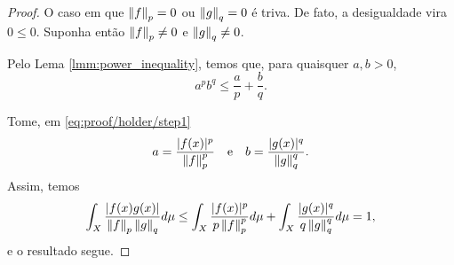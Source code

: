 \begin{proof}
    O caso em que $\left\lVert f \right\rVert_p = 0$ ou $\left\lVert g \right\rVert_q = 0$ é triva. De fato, a desigualdade vira $0 \leq 0$. Suponha então $\left\lVert f \right\rVert_p \neq 0$ e $\left\lVert g \right\rVert_q \neq 0$.

    Pelo Lema \ref{lmm:power_inequality}, temos que, para quaisquer $a, b > 0$,
    \begin{equation}\label{eq:proof/holder/step1}
        a^p b^q \leq \frac{a}{p} + \frac{b}{q}.
    \end{equation}

    Tome, em \eqref{eq:proof/holder/step1}
    \begin{equation*}
        a = \frac{|f(x)|^p}{\left\lVert f \right\rVert_p^p}
        \quad \text{e} \quad
        b = \frac{|g(x)|^q}{\left\lVert g \right\rVert_q^q}.
    \end{equation*}
    Assim, temos
    \begin{equation*}
        \int_X \frac{|f(x)g(x)|}{\left\lVert f \right\rVert_p \left\lVert g \right\rVert_q} d\mu \leq \int_X \frac{|f(x)|^p}{p \left\lVert f \right\rVert_p^p} d\mu + \int_X \frac{|g(x)|^q}{q \left\lVert g \right\rVert_q^q} d\mu = 1,
    \end{equation*}
    e o resultado segue.
\end{proof}
